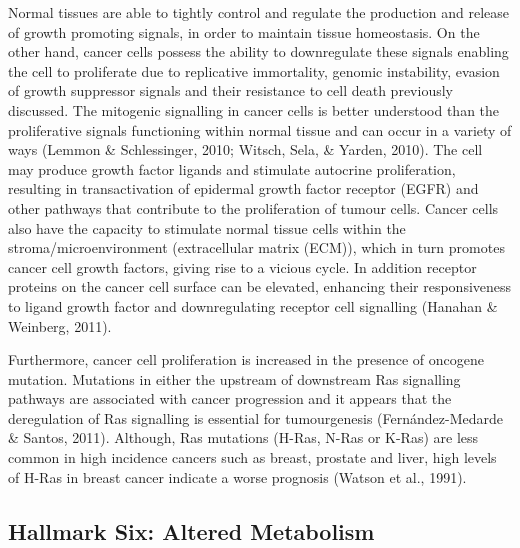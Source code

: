 \documentclass[a4paper, twoside]{templates/ociamthesis}
\begin{document}
Normal tissues are able to tightly control and regulate the production and release of growth promoting signals, in order to maintain tissue homeostasis. On the other hand, cancer cells possess the ability to downregulate these signals enabling the cell to proliferate due to replicative immortality, genomic instability, evasion of growth suppressor signals and their resistance to cell death previously discussed. The mitogenic signalling in cancer cells is better understood than the proliferative signals functioning within normal tissue and can occur in a variety of ways (Lemmon \& Schlessinger, 2010; Witsch, Sela, \& Yarden, 2010). The cell may produce growth factor ligands and stimulate autocrine proliferation, resulting in transactivation of epidermal growth factor receptor (EGFR) and other pathways that contribute to the proliferation of tumour cells. Cancer cells also have the capacity to stimulate normal tissue cells within the stroma/microenvironment (extracellular matrix (ECM)), which in turn promotes cancer cell growth factors, giving rise to a vicious cycle. In addition receptor proteins on the cancer cell surface can be elevated, enhancing their responsiveness to ligand growth factor and downregulating receptor cell signalling (Hanahan \& Weinberg, 2011).

Furthermore, cancer cell proliferation is increased in the presence of oncogene mutation. Mutations in either the upstream of downstream Ras signalling pathways are associated with cancer progression and it appears that the deregulation of Ras signalling is essential for tumourgenesis (Fernández-Medarde \& Santos, 2011). Although, Ras mutations (H-Ras, N-Ras or K-Ras) are less common in high incidence cancers such as breast, prostate and liver, high levels of H-Ras in breast cancer indicate a worse prognosis (Watson et al., 1991).

\hypertarget{hallmark-six-altered-metabolism}{%
\subsection{Hallmark Six: Altered Metabolism}\label{hallmark-six-altered-metabolism}}
\end{document}
